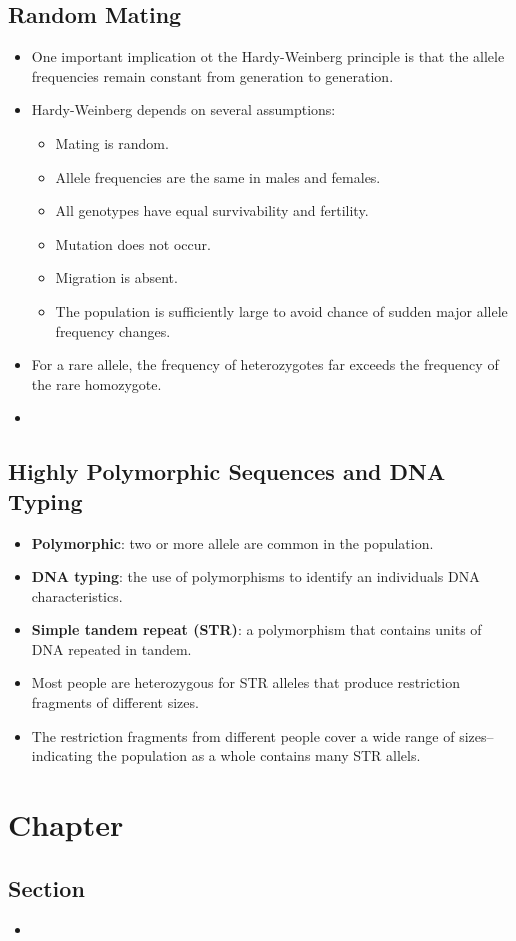 \documentclass[12pt,a4paper]{article}
\begin{document}
\subsection{Random Mating} 
\begin{itemize}
    \item One important implication ot the Hardy-Weinberg principle is that the allele frequencies remain constant from generation to generation.
    \item Hardy-Weinberg depends on several assumptions:
        \begin{itemize}
            \item Mating is random.
            \item Allele frequencies are the same in males and females.
            \item All genotypes have equal survivability and fertility.
            \item Mutation does not occur.
            \item Migration is absent.
            \item The population is sufficiently large to avoid chance of sudden major allele frequency changes.
        \end{itemize}
    \item For a rare allele, the frequency of heterozygotes far exceeds the frequency of the rare homozygote.
    \item 
\end{itemize}

\subsection{Highly Polymorphic Sequences and DNA Typing}
\begin{itemize}
    \item \textbf{Polymorphic}: two or more allele are common in the population.
    \item \textbf{DNA typing}: the use of polymorphisms to identify an individuals DNA characteristics.
    \item \textbf{Simple tandem repeat (STR)}: a polymorphism that contains units of DNA repeated in tandem.
    \item Most people are heterozygous for STR alleles that produce restriction fragments of different sizes.
    \item The restriction fragments from different people cover a wide range of sizes-- indicating the population as a whole contains many STR allels.
\end{itemize}

\clearpage
\section{Chapter}
\subsection{Section}
\begin{itemize}
    \item 
\end{itemize}
\end{document}

